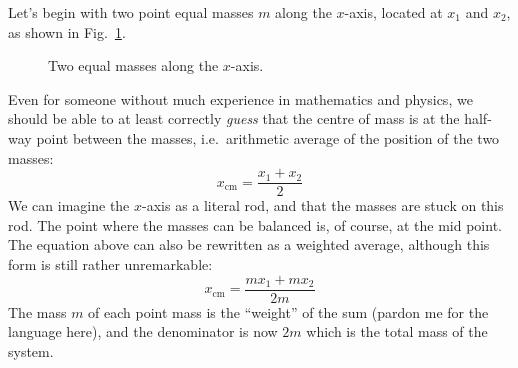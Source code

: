 Let's begin with two point equal masses $m$ along the $x$-axis, located at
$x_1$ and $x_2$, as shown in Fig.~\ref{fig:2-equal-masses}.
\begin{figure}[ht]
  \centering
  \caption{Two equal masses along the $x$-axis.}
  \label{fig:2-equal-masses}
\end{figure}
Even for someone without much experience in mathematics and physics, we should
be able to at least correctly \emph{guess} that the centre of mass is at the
half-way point between the masses, i.e.\ arithmetic average of the position of
the two masses:
\begin{equation*}
  x_\text{cm}=\frac{x_1+x_2}2
\end{equation*}
We can imagine the $x$-axis as a literal rod, and that the masses are stuck on
this rod. The point where the masses can be balanced is, of course, at the mid
point. The equation above can also be rewritten as a weighted average, although
this form is still rather unremarkable:
\begin{equation*}
  x_\text{cm}=\frac{mx_1+mx_2}{2m}
\end{equation*}
The mass $m$ of each point mass is the ``weight'' of the sum (pardon me for the
language here), and the denominator is now $2m$ which is the total mass of the
system.

